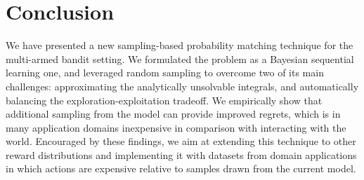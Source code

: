 \documentclass[10pt]{article}
\begin{document}
\section{Conclusion}
\label{sec:conclusion}

We have presented a new sampling-based probability matching technique for the multi-armed bandit setting. We formulated the problem as a Bayesian sequential learning one, and leveraged random sampling to overcome two of its main challenges: approximating the analytically unsolvable integrals, and automatically balancing the exploration-exploitation tradeoff. We empirically show that additional sampling from the model can provide improved regrets, which is in many application domains inexpensive in comparison with interacting with the world. Encouraged by these findings, we aim at extending this technique to other reward distributions and implementing it with datasets from domain applications in which actions are expensive relative to samples drawn from the current model.




\end{document}
